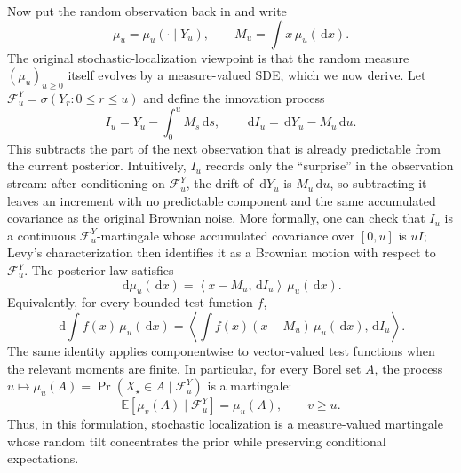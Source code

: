\documentclass{amsart}
\numberwithin{equation}{section}
\theoremstyle{plain}
\theoremstyle{definition}
\theoremstyle{remark}
\newcommand{\E}{\mathbb{E}}
\newcommand{\dd}{\,\mathrm{d}}
\newcommand{\Id}{I}
\newcommand{\cF}{\mathcal{F}}
\newcommand{\ip}[2]{\left\langle #1,#2 \right\rangle}
\begin{document}
Now put the random observation back in and write
\[
    \mu_u=\mu_u(\cdot\mid Y_u),
    \qquad
    M_u=\int x\,\mu_u(\dd x).
\]
The original stochastic-localization viewpoint is that the random measure
$(\mu_u)_{u\geq0}$ itself evolves by a measure-valued SDE, which we now derive.  Let
$\cF_u^Y=\sigma(Y_r:0\leq r\leq u)$ and define the innovation process
\[
    I_u=Y_u-\int_0^u M_s\dd s,
    \qquad
    \dd I_u=\dd Y_u-M_u\dd u.
\]
This subtracts the part of the next observation that is already predictable
from the current posterior.  Intuitively, $I_u$ records only the ``surprise'' in
the observation stream: after conditioning on $\cF_u^Y$, the drift of
$\dd Y_u$ is $M_u\dd u$, so subtracting it leaves an increment with no
predictable component and the same accumulated covariance as the original
Brownian noise.  More formally, one can check that $I_u$ is a continuous
$\cF_u^Y$-martingale whose accumulated covariance over $[0,u]$ is $u\Id$;
Levy's characterization then identifies it as a Brownian motion with respect
to $\cF_u^Y$.  The posterior law satisfies
\begin{equation}\label{eq:sl-measure-sde}
    \dd \mu_u(\dd x)
    =
    \ip{x-M_u}{\dd I_u}\,\mu_u(\dd x).
\end{equation}
Equivalently, for every bounded test function $f$,
\[
    \dd\int f(x)\,\mu_u(\dd x)
    =
    \ip{\int f(x)(x-M_u)\,\mu_u(\dd x)}{\dd I_u}.
\]
The same identity applies componentwise to vector-valued test functions when
the relevant moments are finite.
In particular, for every Borel set $A$, the process
$u\mapsto\mu_u(A)=\Pr(X_\star\in A\mid\cF_u^Y)$ is a martingale:
\[
    \E[\mu_v(A)\mid\cF_u^Y]=\mu_u(A),
    \qquad v\geq u.
\]
Thus, in this formulation, stochastic localization is a measure-valued
martingale whose random tilt concentrates the prior while preserving
conditional expectations.
\end{document}
